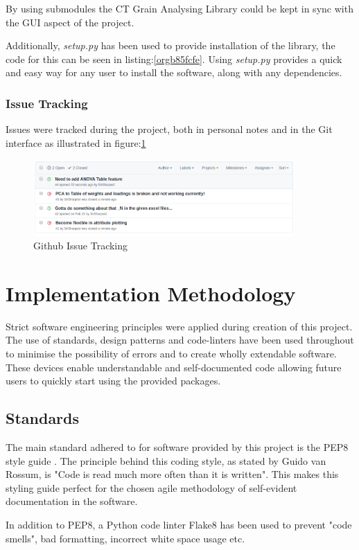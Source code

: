 \documentclass[11pt]{report}
\begin{document}
By using submodules the CT Grain Analysing Library could be kept in sync with the GUI aspect of the project.

Additionally, \emph{setup.py} has been used to provide installation of the library, the code for this can be seen in listing:\ref{orgb85fcfe}. Using \emph{setup.py} provides a quick and easy way for any user to install the software, along with any dependencies.

\subsubsection{Issue Tracking}
\label{sec:org2f0f23d}
Issues were tracked during the project, both in personal notes and in the Git interface as illustrated in figure:\ref{fig:org37d25aa}
\begin{figure}[htbp]
\centering
\includegraphics[width=10cm]{./images/github.png}
\caption{\label{fig:org37d25aa}
Github Issue Tracking}
\end{figure}

\section{Implementation Methodology}
\label{sec:orge37ad59}
Strict software engineering principles were applied during creation of this project. The use of standards, design patterns and code-linters have been used throughout to minimise the possibility of errors and to create wholly extendable software. These devices enable understandable and self-documented code allowing future users to quickly start using the provided packages.
\subsection{Standards}
\label{sec:org27df4ad}
The main standard adhered to for software provided by this project is the PEP8 style guide \cite{VanRossum}. The principle behind this coding style, as stated by Guido van Rossum, is "Code is read much more often than it is written". This makes this styling guide perfect for the chosen agile methodology of self-evident documentation in the software.

In addition to PEP8, a Python code linter Flake8 has been used to prevent "code smells", bad formatting, incorrect white space usage etc.
\end{document}

